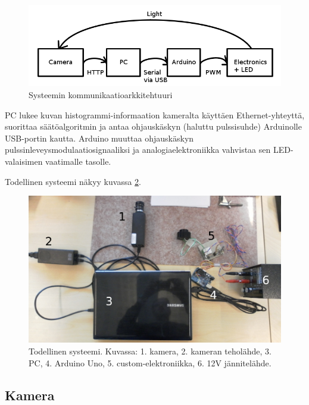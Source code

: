 \documentclass[finnish,12pt]{article}
\begin{document}
\begin{figure}[htcb]
 \begin{center}
 \includegraphics[scale=0.5]{kuvat/commdiagram.png}
 \caption{Systeemin kommunikaatioarkkitehtuuri}
 \label{fig:kommunikaatio}
 \end{center}
\end{figure}

PC lukee kuvan histogrammi-informaation kameralta käyttäen Ethernet-yhteyttä, suorittaa säätöalgoritmin ja antaa ohjauskäskyn (haluttu pulssisuhde) Arduinolle USB-portin kautta. Arduino muuttaa ohjauskäskyn pulssinleveysmodulaatiosignaaliksi ja analogiaelektroniikka vahvistaa sen LED-valaisimen vaatimalle tasolle.

Todellinen systeemi näkyy kuvassa \ref{fig:systeemi}.

\begin{figure}[htcb]
 \begin{center}
  \includegraphics[scale=0.4]{kuvat/systeemi.jpg}
  \caption{Todellinen systeemi. Kuvassa: 1. kamera, 2. kameran teholähde, 3. PC, 4. Arduino Uno, 5. custom-elektroniikka, 6. 12V jännitelähde.}
  \label{fig:systeemi}
 \end{center}

\end{figure}


\subsection{Kamera}
\end{document}
